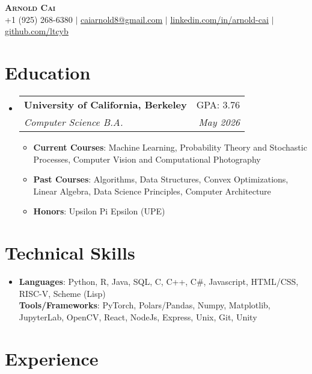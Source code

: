 \documentclass[letterpaper,11pt]{article}
\makeatletter
\newcommand{\resumeItemBF}[2]{
  \item\small{
    \textbf{#1}{: #2 \vspace{-2pt}}
  }
}
\newcommand{\resumeSubheading}[4]{
  \vspace{-2pt}\item
    \begin{tabular*}{0.97\textwidth}[t]{l@{\extracolsep{\fill}}r}
      \textbf{#1} & #2 \\
      \textit{\small#3} & \textit{\small #4} \\
    \end{tabular*}\vspace{-7pt}
}
\newcommand{\resumeSubHeadingListStart}{\begin{itemize}[leftmargin=0.15in, label={}]}
\newcommand{\resumeSubHeadingListEnd}{\end{itemize}}
\newcommand{\resumeItemListStart}{\begin{itemize}}
\newcommand{\resumeItemListEnd}{\end{itemize}\vspace{-5pt}}
\makeatother
\begin{document}
\begin{center}
    \textbf{\Huge \scshape Arnold Cai} \\ \vspace{5pt}
    \small +1 (925) 268-6380 $|$
    \href{mailto:caiarnold8@gmail.c0om}{\underline{caiarnold8@gmail.com}} $|$
    \href{https://www.linkedin.com/in/arnold-cai/}{\underline{linkedin.com/in/arnold-cai}} $|$
    \href{https://github.com/ltcyb/}{\underline{github.com/ltcyb}}
\end{center}

\section{Education}

\resumeSubHeadingListStart
    \resumeSubheading
        {University of California, Berkeley}{GPA: 3.76}{Computer Science B.A.}{May 2026}
        \resumeItemListStart
            \resumeItemBF{Current Courses}{Machine Learning, Probability Theory and Stochastic Processes, Computer Vision and Computational Photography}
            \resumeItemBF{Past Courses}{Algorithms, Data Structures, Convex Optimizations, Linear Algebra, Data Science Principles, Computer Architecture}
            \resumeItemBF{Honors}{Upsilon Pi Epsilon (UPE)}
        \resumeItemListEnd
\resumeSubHeadingListEnd

\section{Technical Skills}

\begin{itemize}[leftmargin=0.15in, label={}]
    \item{

    \textbf{Languages}: Python, R, Java, SQL, C, C++, C\#, Javascript, HTML/CSS, RISC-V, Scheme (Lisp)\\

    \textbf{Tools/Frameworks}: PyTorch, Polars/Pandas, Numpy, Matplotlib, JupyterLab, OpenCV, React, NodeJs, Express, Unix, Git, Unity\\

    }

\end{itemize}

\section{Experience}
\end{document}
